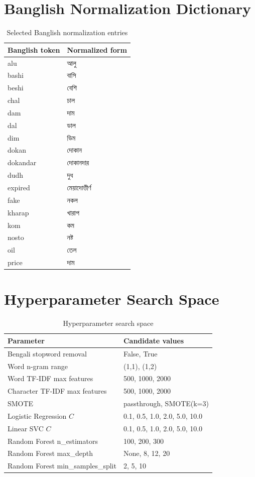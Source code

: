 \documentclass[12pt,a4paper,openany]{book}
\newcommand{\bn}[1]{{\banglafont #1}}
\newcommand{\bn}[1]{#1}
\begin{document}
\chapter{Banglish Normalization Dictionary}
\begin{longtable}{ll}
\caption{Selected Banglish normalization entries}\\
\toprule
\textbf{Banglish token} & \textbf{Normalized form}\\
\midrule
alu & \bn{আলু}\\
bashi & \bn{বাসি}\\
beshi & \bn{বেশি}\\
chal & \bn{চাল}\\
dam & \bn{দাম}\\
dal & \bn{ডাল}\\
dim & \bn{ডিম}\\
dokan & \bn{দোকান}\\
dokandar & \bn{দোকানদার}\\
dudh & \bn{দুধ}\\
expired & \bn{মেয়াদোত্তীর্ণ}\\
fake & \bn{নকল}\\
kharap & \bn{খারাপ}\\
kom & \bn{কম}\\
nosto & \bn{নষ্ট}\\
oil & \bn{তেল}\\
price & \bn{দাম}\\
\bottomrule
\end{longtable}

\chapter{Hyperparameter Search Space}
\begin{longtable}{p{}p{}}
\caption{Hyperparameter search space}\\
\toprule
\textbf{Parameter} & \textbf{Candidate values}\\
\midrule
Bengali stopword removal & False, True\\
Word n-gram range & (1,1), (1,2)\\
Word TF-IDF max features & 500, 1000, 2000\\
Character TF-IDF max features & 500, 1000, 2000\\
SMOTE & passthrough, SMOTE(k=3)\\
Logistic Regression $C$ & 0.1, 0.5, 1.0, 2.0, 5.0, 10.0\\
Linear SVC $C$ & 0.1, 0.5, 1.0, 2.0, 5.0, 10.0\\
Random Forest n\_estimators & 100, 200, 300\\
Random Forest max\_depth & None, 8, 12, 20\\
Random Forest min\_samples\_split & 2, 5, 10\\
\bottomrule
\end{longtable}
\end{document}

